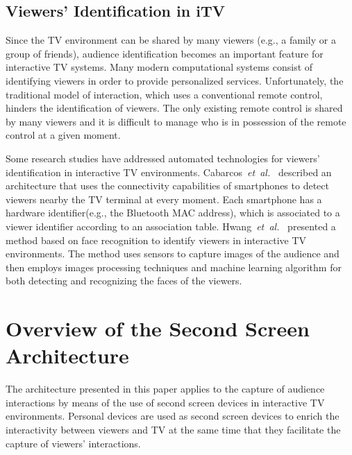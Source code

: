 \documentclass[journal]{IEEEtran}
\begin{document}
\subsection{Viewers' Identification in iTV}
\label{ssec_ident_viewers_itv}

Since the TV environment can be shared by many viewers (e.g., a family or a group of friends), audience identification becomes an important feature for interactive TV systems. Many modern computational systems consist of identifying viewers in order to provide personalized services. Unfortunately, the traditional model of interaction, which uses a conventional remote control, hinders the identification of viewers. The only existing remote control is shared by many viewers and it is difficult to manage who is in possession of the remote control at a given moment.

Some research studies have addressed automated technologies for viewers' identification in interactive TV environments. Cabarcos~\emph{et~al.}~\cite{Cabarcos2011} described an architecture that uses the connectivity capabilities of smartphones to detect viewers nearby the TV terminal at every moment. Each smartphone has a hardware identifier(e.g., the Bluetooth MAC address), which is associated to a viewer identifier according to an association table. Hwang~\emph{et~al.}~\cite{Hwang2007} presented a method based on face recognition to identify viewers in interactive TV environments. The method uses sensors to capture images of the audience and then employs images processing techniques and machine learning algorithm for both detecting and recognizing the faces of the viewers.

\section{Overview of the Second Screen Architecture}
\label{sec_overview}

The architecture presented in this paper applies to the capture of audience interactions by means of the use of second screen devices in interactive TV environments. Personal devices are used as second screen devices to enrich the interactivity between viewers and TV at the same time that they facilitate the capture of viewers' interactions.
\end{document}
